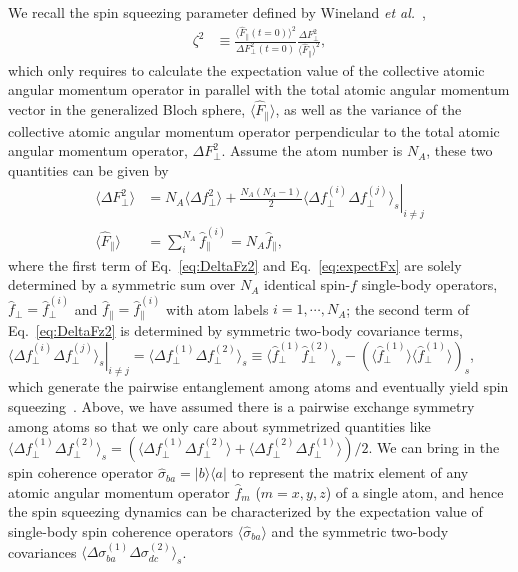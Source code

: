\documentclass[preprint,aps,pra,onecolumn,superscriptaddress]{revtex4-1} %
\def\bra#1{\langle{#1}\rvert}%
\def\ket#1{\lvert{#1}\rangle}%
\newcommand{\expect}[1]{\big\langle #1 \big\rangle}
\begin{document}
We recall the spin squeezing parameter defined by Wineland {\emph{et al.}}~\cite{Wineland1992},
\begin{align}
\zeta^2 &\equiv \frac{\expect{\hat{F}_\parallel(t=0)}^2}{\Delta F_\perp^2(t=0)} \frac{\Delta F_\perp^2}{\expect{\hat{F}_\parallel}^2},
\end{align}
which only requires to calculate the expectation value of the collective atomic angular momentum operator in parallel with the total atomic angular momentum vector in the generalized Bloch sphere, $ \expect{\hat{F}_\parallel} $, as well as the variance of the collective atomic angular momentum operator perpendicular to the total atomic angular momentum operator, $ \Delta F_\perp^2 $. 
Assume the atom number is $ N_A $, these two quantities can be given by 
\begin{align}
\expect{\Delta F_\perp^2} &= N_A \expect{\Delta f_\perp^2}+\frac{N_A(N_A-1)}{2}\left. \expect{\Delta f_\perp^{(i)}\Delta f_\perp^{(j)}}_s\right|_{i\neq j}\label{eq:DeltaFz2}\\
\expect{\hat{F}_\parallel } &= \sum_i^{N_A} \hat{f}_\parallel ^{(i)}=N_A \hat{f}_\parallel,\label{eq:expectFx}
\end{align}
where the first term of Eq.~\eqref{eq:DeltaFz2} and Eq.~\eqref{eq:expectFx} are solely determined by a symmetric sum over $N_A$ identical spin-$f$ single-body operators, $ \hat{f}_\perp=\hat{f}_\perp^{(i)} $ and $ \hat{f}_\parallel=\hat{f}_\parallel^{(i)} $ with atom labels $ i=1,\cdots,N_A $; the second term of Eq.~\eqref{eq:DeltaFz2} is determined by symmetric two-body covariance terms, $ \left.\expect{\Delta f_\perp^{(i)}\Delta f_\perp^{(j)}}_s\right|_{i\neq j}=\expect{\Delta f_\perp^{(1)}\Delta f_\perp^{(2)}}_s\equiv \expect{\hat{f}_\perp^{(1)}\hat{f}_\perp^{(2)}}_s-\left( \expect{\hat{f}_\perp^{(1)}} \expect{\hat{f}_\perp^{(1)}}\right)_s $, which generate the pairwise entanglement among atoms and eventually yield spin squeezing~\cite{Wang2003Spin}.
Above, we have assumed there is a pairwise exchange symmetry among atoms so that we only care about symmetrized quantities like $ \expect{\Delta f_\perp^{(1)}\Delta f_\perp^{(2)}}_s=\left(\expect{\Delta f_\perp^{(1)}\Delta f_\perp^{(2)}} + \expect{\Delta f_\perp^{(2)}\Delta f_\perp^{(1)}} \right)/2 $. 
We can bring in the spin coherence operator $\hat{\sigma}_{ba}=\ket{b}\bra{a}$ to represent the matrix element of any atomic angular momentum operator $ \hat{f}_m $ ($ m=x,y,z $) of a single atom, and hence the spin squeezing dynamics can be characterized by the expectation value of single-body spin coherence operators $\expect{\hat{\sigma}_{ba}}$ and the symmetric two-body covariances $\expect{\Delta \sigma_{ba}^{(1)}\Delta\sigma_{dc}^{(2)} }_s$. 
\end{document}
